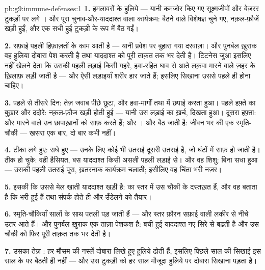 \begin{solution}{pb:g9:immune-defenses:1}
\textbf{1.} हमलावरों के हुलिये --- यानी कमज़ोर किए गए सूक्ष्मजीवों और
बेज़रर टुकड़ों पर लगे । और पूरा चुनाव-और-याददाश्त वाला कार्यक्रम:
बैठने वाले विशेषज्ञ चुने गए, नक़ल-फ़ौजें खड़ी हुईं, और  एक
सधी हुई टुकड़ी के रूप में बैठ गईं।

\textbf{2.} सफ़ाई पहली हिफ़ाज़तों के काम आती है --- यानी प्रवेश पर
बुहारा गया दरवाज़ा। और पुनर्बल ख़ुराक वह हुलिया दोबारा पेश करती है तथा
याददाश्त को पूरी ताक़त तक भर देती है। टिटनेस जुआ इसलिए नहीं खेलने देता कि
उसकी पहली लड़ाई किसी गहरे, हवा-रहित घाव से आते लक़वा मारने वाले ज़हर के
ख़िलाफ़ लड़ी जाती है --- और ऐसी लड़ाइयाँ शरीर हार जाते हैं; इसलिए सिखाना
उससे पहले ही होना चाहिए।

\textbf{3.} पहले से तीसरे दिन: तेज़ जवाब पीछे छूटा, और  हवा-मार्गों
तथा  में छपाई करता हुआ। पहले हफ़्ते का बुख़ार और ददोरे: नक़ल-फ़ौज
खड़ी होती हुई --- यानी उस लड़ाई का ख़र्च, दिखता हुआ। दूसरा हफ़्ता:
 और मारने वाले उन छापाख़ानों को साफ़ करते हैं; और । और
बैठ जाती है: जीवन भर की एक स्मृति-चौकी --- खसरा एक बार, दो बार कभी
नहीं।

\textbf{4.} टीका लगे हुए: सधे हुए --- उनके लिए कोई भी उतराई दूसरी उतराई
है, जो घंटों में साफ़ हो जाती है। ठीक हो चुके: वही हैसियत, बस याददाश्त
किसी असली पहली लड़ाई से। और वह शिशु: बिना सधा हुआ --- उसकी पहली उतराई
पूरा, ख़तरनाक कार्यक्रम चलाती; इसीलिए वह चिंता भरी नज़र।

\textbf{5.} इसकी कि उससे मेल खाती याददाश्त खड़ी है:  का स्तर
 में उस चौकी के दस्तख़त हैं, और वह बताता है कि  भरी
हुई हैं तथा संपर्क होते ही और उँडेलने को तैयार।

\textbf{6.} स्मृति-चौकियाँ सालों के साथ पतली पड़ जाती हैं --- और स्तर
फ़ौरन सफ़ाई वाली लकीर से नीचे उतर आते हैं। और पुनर्बल ख़ुराक एक ताज़ा
पेशकश है: बची हुई याददाश्त नए सिरे से बढ़ती है और उस चौकी को फिर पूरी
ताक़त तक भर देती है।

\textbf{7.} उसका तेज़ : हर मौसम की नस्लें दोबारा लिखे हुए
हुलिये ढोती हैं, इसलिए पिछले साल की सिखाई इस साल के  पर बैठती ही
नहीं --- और उस टुकड़ी को हर साल मौजूदा हुलिये पर दोबारा सिखाना पड़ता है।


\end{solution}
